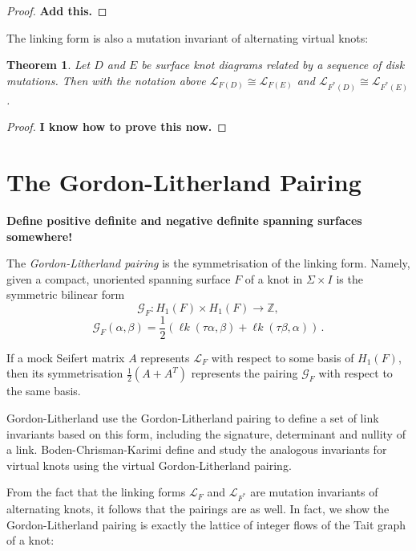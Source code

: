 \documentclass[12pt]{report}
\newcommand{\Z}{\mathbb{Z}}
\newcommand{\lk}{\operatorname{\ell\textit{k}}}
\newcommand{\notered}[1]{{\color{Red} \textbf{#1}}}
\newtheorem*{theorem}{Theorem}
\theoremstyle{upright}
\begin{document}
\begin{proof}
	\notered{Add this.}
\end{proof}

The linking form is also a mutation invariant of alternating virtual knots:

\begin{theorem}
Let $D$ and $E$ be surface knot diagrams related by a sequence of disk mutations. Then with the notation above $\mathcal{L}_{F(D)} \cong \mathcal{L}_{F(E)}$ and $\mathcal{L}_{F^{*}(D)} \cong \mathcal{L}_{F^{*}(E)}$.
\end{theorem}

\begin{proof}
\notered{I know how to prove this now.}
\end{proof}

\section{The Gordon-Litherland Pairing}

\notered{Define positive definite and negative definite spanning surfaces somewhere!}

The \textit{Gordon-Litherland pairing} is the symmetrisation of the linking form. Namely, given a compact, unoriented spanning surface $F$ of a knot in $\Sigma \times I$ is the symmetric bilinear form
\[\mathcal{G}_{F}: H_{1}(F) \times H_{1}(F) \longrightarrow \Z,\]
\[\mathcal{G}_{F}(\alpha, \beta) = \dfrac{1}{2}(\lk(\tau \alpha, \beta) + \lk(\tau\beta, \alpha))\,.\]

If a mock Seifert matrix $A$ represents $\mathcal{L}_{F}$ with respect to some basis of $H_{1}(F)$, then its symmetrisation $\frac{1}{2}(A + A^{T})$ represents the pairing $\mathcal{G}_{F}$ with respect to the same basis.

Gordon-Litherland \cite{signature-of-a-link} use the Gordon-Litherland pairing to define a set of link invariants based on this form, including the signature, determinant and nullity of a link. Boden-Chrisman-Karimi \cite{gordon-litherland-pairing-thickened-surfaces} define and study the analogous invariants for virtual knots using the virtual Gordon-Litherland pairing.

From the fact that the linking forms $\mathcal{L}_{F}$ and $\mathcal{L}_{F^{*}}$ are mutation invariants of alternating knots, it follows that the pairings are as well. In fact, we show the Gordon-Litherland pairing is exactly the lattice of integer flows of the Tait graph of a knot:
\end{document}
